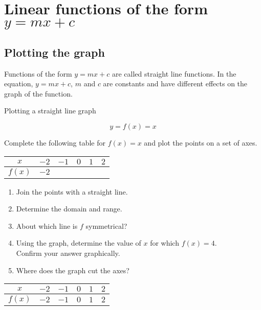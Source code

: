 \section{Linear functions of the form $y=mx+c$}


\subsection*{Plotting the graph}       
Functions of the form $y=mx+c$ are called straight line functions. In the equation, $y=mx+c$, $m$ and $c$ are constants and have different effects on the graph of the function. 
\begin{wex}{Plotting a straight line graph}
{
\begin{equation*}
 y = f(x) = x
\end{equation*}

Complete the following table for $f(x)=x$ and plot the points on a set of axes.
\\
\begin{center}
\begin{tabular}{|c|c|c|c|c|c|}
\hline
  $x$ &  $-2$ & $-1$ & $0$ & $1$ & $2$ 
\\ \hline
 $f(x)$& $-2$ & \phantom{$-2$} & \phantom{$-2$} & \phantom{$-2$} & \phantom{$-2$}
\\ \hline
\end{tabular}
\end{center}
\vspace{10pt}
\begin{minipage}{\textwidth}
\begin{enumerate}[noitemsep, label=\textbf{\arabic*}. ] 
 \item Join the points with a straight line.
\item Determine the domain and range.
\item About which line is $f$ symmetrical?
\item Using the graph, determine the value of $x$ for which $f(x) = 4$. \\Confirm your answer graphically.
\item Where does the graph cut the axes?
\end{enumerate}
\end{minipage}
}
{

\begin{center}
\begin{tabular}{|c|c|c|c|c|c|}
\hline
  $x$ &  $-2$ & $-1$ & $0$ & $1$ & $2$ 
\\ \hline
 $f(x)$& $-2$ & $-1$ & $0$ & $1$ & $2$ 
\\ \hline
\end{tabular}
\end{center}

}
\end{wex}

